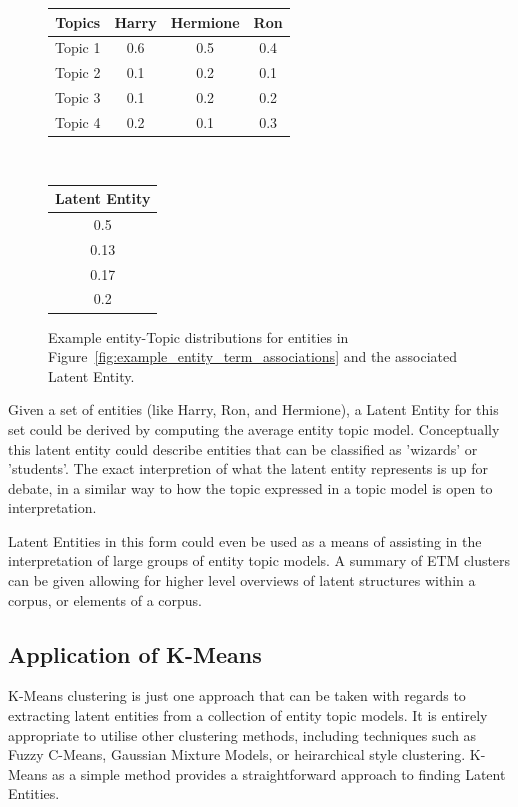 \documentclass[10pt]{report}
\begin{document}
\begin{figure}
  \centering
    \begin{tabular}{*4c}
      Topics&Harry&Hermione&Ron\\
      \hline
      Topic 1 & 0.6 & 0.5  & 0.4 \\
      Topic 2 & 0.1 & 0.2  & 0.1 \\
      Topic 3 & 0.1 & 0.2  & 0.2 \\
      Topic 4 & 0.2 & 0.1  & 0.3 \\  
    \end{tabular}
    \vline \,
    \begin{tabular}{*1c}
      \multicolumn{1}{c}{Latent Entity}\\
      \hline
      0.5 \\
      0.13 \\
      0.17\\
      0.2\\
      
      \end{tabular}
  \caption{Example entity-Topic distributions for entities in Figure~\ref{fig:example_entity_term_associations} and the associated Latent Entity. \label{fig:example_entity_topic_distribution}}
\end{figure}

Given a set of entities (like Harry, Ron, and Hermione), a Latent Entity for this set could be derived by computing the average entity topic model. Conceptually this latent entity could describe entities that can be classified as 'wizards' or 'students'. The exact interpretion of what the latent entity represents is up for debate, in a similar way to how the topic expressed in a topic model is open to interpretation.

Latent Entities in this form could even be used as a means of assisting in the interpretation of large groups of entity topic models. A summary of ETM clusters can be given allowing for higher level overviews of latent structures within a corpus, or elements of a corpus.

\subsection{Application of K-Means}
K-Means clustering is just one approach that can be taken with regards to extracting latent entities from a collection of entity topic models. It is entirely appropriate to utilise other clustering methods, including techniques such as Fuzzy C-Means, Gaussian Mixture Models, or heirarchical style clustering. K-Means as a simple method provides a straightforward approach to finding Latent Entities.
\end{document}
